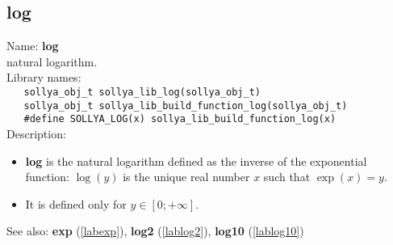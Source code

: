\subsection{log}
\label{lablog}
\noindent Name: \textbf{log}\\
\phantom{aaa}natural logarithm.\\[0.2cm]
\noindent Library names:\\
\verb|   sollya_obj_t sollya_lib_log(sollya_obj_t)|\\
\verb|   sollya_obj_t sollya_lib_build_function_log(sollya_obj_t)|\\
\verb|   #define SOLLYA_LOG(x) sollya_lib_build_function_log(x)|\\[0.2cm]
\noindent Description: \begin{itemize}

\item \textbf{log} is the natural logarithm defined as the inverse of the exponential
   function: $\log(y)$ is the unique real number $x$ such that $\exp(x)=y$.

\item It is defined only for $y \in [0; +\infty]$.
\end{itemize}
See also: \textbf{exp} (\ref{labexp}), \textbf{log2} (\ref{lablog2}), \textbf{log10} (\ref{lablog10})
